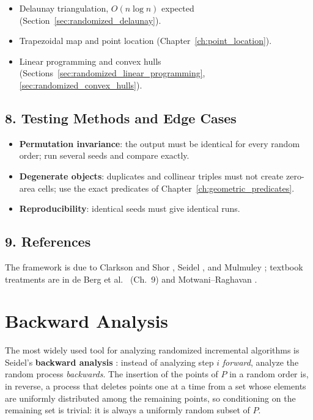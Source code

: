 \begin{itemize}
\item Delaunay triangulation, $O(n \log n)$ expected (Section~\ref{sec:randomized_delaunay}).
\item Trapezoidal map and point location (Chapter~\ref{ch:point_location}).
\item Linear programming and convex hulls (Sections~\ref{sec:randomized_linear_programming},
  \ref{sec:randomized_convex_hulls}).
\end{itemize}

\subsection{8. Testing Methods and Edge Cases}

\begin{itemize}
\item \textbf{Permutation invariance}: the output must be identical for every
  random order; run several seeds and compare exactly.
\item \textbf{Degenerate objects}: duplicates and collinear triples must not
  create zero-area cells; use the exact predicates of
  Chapter~\ref{ch:geometric_predicates}.
\item \textbf{Reproducibility}: identical seeds must give identical runs.
\end{itemize}

\subsection{9. References}

The framework is due to Clarkson and Shor \cite{clarkson1989}, Seidel
\cite{seidel1993}, and Mulmuley \cite{mulmuley1994}; textbook treatments are in
de Berg et al.\ \cite{deberg2008} (Ch.~9) and Motwani--Raghavan
\cite{motwani1995}.

\section{Backward Analysis}
\label{sec:randomized_backward_analysis}

The most widely used tool for analyzing randomized incremental algorithms is
Seidel's \textbf{backward analysis} \cite{seidel1993}:
instead of analyzing step $i$ \emph{forward}, analyze the random process
\emph{backwards}. The insertion of the points of $P$ in a random order is, in
reverse, a process that deletes points one at a time from a set whose elements
are uniformly distributed among the remaining points, so conditioning on the
remaining set is trivial: it is always a uniformly random subset of $P$.

